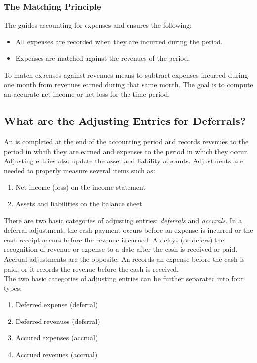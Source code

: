 \documentclass{article}
\begin{document}
\subsubsection{The Matching Principle}

The  guides accounting for expenses and ensures the following: 
\begin{itemize}
  \item All expenses are recorded when they are incurred during the period. 
  \item Expenses are matched against the revenues of the period. 
\end{itemize}
To match expenses against revenues means to subtract expenses incurred during one month from revenues earned during that same month. The goal is to compute an accurate net income or net loss for the time period. 

\subsection{What are the Adjusting Entries for Deferrals?}

An  is completed at the end of the accounting period and records revenues to the period in whcih they are earned and expenses to the period in which they occur. Adjusting entries also update the asset and liability accounts. Adjustments are needed to properly measure several items such as: 
\begin{enumerate}
  \item Net income (loss) on the income statement 
  \item Assets and liabilities on the balance sheet
\end{enumerate}
There are two basic categories of adjusting entries: \emph{deferrals} and \emph{accurals}. In a deferral adjustment, the cash payment occurs before an expense is incurred or the cash receipt occurs before the revenue is earned. A  delays (or defers) the recognition of revenue or expense to a date after the cash is received or paid. Accrual adjustments are the opposite. An  records an expense before the cash is paid, or it records the revenue before the cash is received. \\ 

The two basic categories of adjusting entries can be further separated into four types: 
\begin{enumerate}
  \item Deferred expense (deferral) 
  \item Deferred revenues (deferral) 
  \item Accured expenses (accrual) 
  \item Accrued revenues (accrual)
\end{enumerate}
\end{document}
